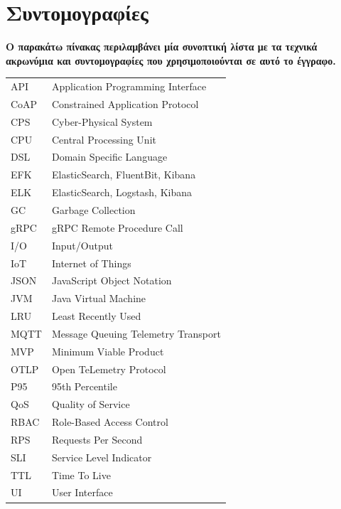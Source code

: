 \section*{Συντομογραφίες}

\noindent
\textbf{Ο παρακάτω πίνακας περιλαμβάνει μία συνοπτική λίστα με τα τεχνικά ακρωνύμια και συντομογραφίες που χρησιμοποιούνται σε αυτό το έγγραφο.}
\vspace{0.5em}

\begin{table}[htpb]
	\centering
	\begin{tabular}{l@{$\;\;\longrightarrow\;\;$}l}
		API  & Application Programming Interface   \\
		CoAP & Constrained Application Protocol    \\
		CPS  & Cyber-Physical System               \\
		CPU  & Central Processing Unit             \\
		DSL  & Domain Specific Language            \\
		EFK  & ElasticSearch, FluentBit, Kibana    \\
		ELK  & ElasticSearch, Logstash, Kibana     \\
		GC   & Garbage Collection                  \\
		gRPC & gRPC Remote Procedure Call          \\
		I/O  & Input/Output                        \\
		IoT  & Internet of Things                  \\
		JSON & JavaScript Object Notation          \\
		JVM  & Java Virtual Machine                \\
		LRU  & Least Recently Used                 \\
		MQTT & Message Queuing Telemetry Transport \\
		MVP  & Minimum Viable Product              \\
		OTLP & Open TeLemetry Protocol             \\
		P95  & 95th Percentile                     \\
		QoS  & Quality of Service                  \\
		RBAC & Role-Based Access Control           \\
		RPS  & Requests Per Second                 \\
		SLI  & Service Level Indicator             \\
		TTL  & Time To Live                        \\
		UI   & User Interface                      \\
	\end{tabular}
\end{table}
